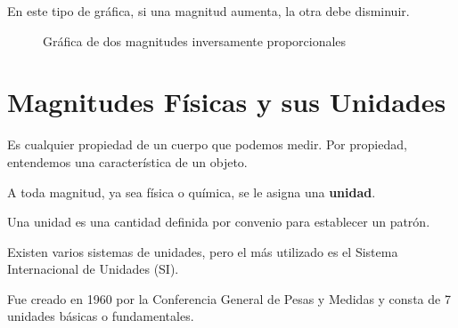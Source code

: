 \begin{enumerate}[label=\numberballmDarkTeal]
\begin{itemize}
            \begin{remark}
                En este tipo de gráfica, si una magnitud aumenta, la otra debe disminuir.
            \end{remark}

            \begin{figure}[H]
                \centering
                \caption{Gráfica de dos magnitudes inversamente proporcionales}
            \end{figure}
        \end{itemize}
\end{enumerate}


\section{Magnitudes Físicas y sus Unidades}

\begin{definition}
        Es cualquier propiedad de un cuerpo que podemos medir.
        Por propiedad, entendemos una característica de un objeto.
\end{definition}
\vspace*{-8pt}
A toda magnitud, ya sea física o química, se le asigna una \textbf{unidad}.
\begin{definition}[Unidad]
        Una unidad es una cantidad definida por convenio para establecer un patrón.
\end{definition}
\vspace*{6pt}
Existen varios sistemas de unidades, pero el más utilizado es el Sistema Internacional de Unidades (SI).

Fue creado en 1960 por la Conferencia General de Pesas y Medidas y consta de 7 unidades básicas o fundamentales.

